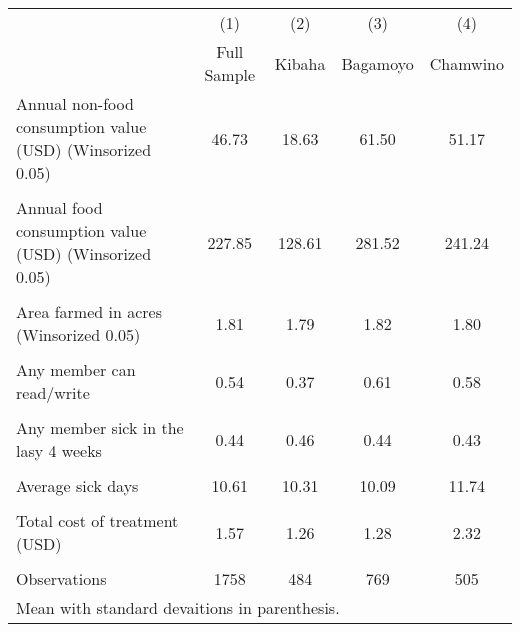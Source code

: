{
\def\sym#1{\ifmmode^{#1}\else\(^{#1}\)\fi}
\begin{tabular}{l*{4}{c}}
\hline\hline
                    &\multicolumn{1}{c}{(1)}&\multicolumn{1}{c}{(2)}&\multicolumn{1}{c}{(3)}&\multicolumn{1}{c}{(4)}\\
                    &\multicolumn{1}{c}{Full Sample}&\multicolumn{1}{c}{Kibaha}&\multicolumn{1}{c}{Bagamoyo}&\multicolumn{1}{c}{Chamwino}\\
\hline
Annual non-food consumption value (USD) (Winsorized 0.05)&       46.73         &       18.63         &       61.50         &       51.17         \\
                    &                     &                     &                     &                     \\
[1em]
Annual food consumption value (USD) (Winsorized 0.05)&      227.85         &      128.61         &      281.52         &      241.24         \\
                    &                     &                     &                     &                     \\
[1em]
Area farmed in acres (Winsorized 0.05)&        1.81         &        1.79         &        1.82         &        1.80         \\
                    &                     &                     &                     &                     \\
[1em]
Any member can read/write&        0.54         &        0.37         &        0.61         &        0.58         \\
                    &                     &                     &                     &                     \\
[1em]
Any member sick in the lasy 4 weeks&        0.44         &        0.46         &        0.44         &        0.43         \\
                    &                     &                     &                     &                     \\
[1em]
Average sick days   &       10.61         &       10.31         &       10.09         &       11.74         \\
                    &                     &                     &                     &                     \\
[1em]
Total cost of treatment (USD)&        1.57         &        1.26         &        1.28         &        2.32         \\
                    &                     &                     &                     &                     \\
\hline
Observations        &        1758         &         484         &         769         &         505         \\
\hline\hline
\multicolumn{5}{l}{\footnotesize Mean with standard devaitions in parenthesis.}\\
\end{tabular}
}

